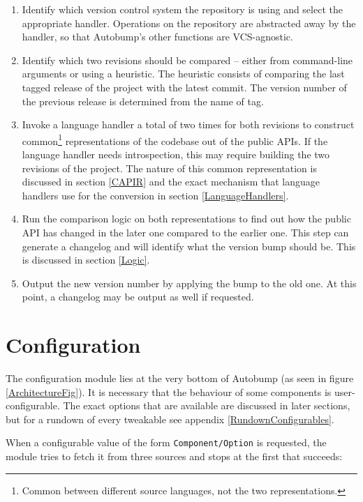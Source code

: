 \documentclass{l4proj}
\newcommand\genericstyle{\lstset{basicstyle=\ttm}}
\newcommand\codeinline[1]{{\genericstyle\lstinline!#1!}}
\begin{document}
\begin{enumerate}
\item Identify which version control system the repository is using
and select the appropriate handler. Operations on the repository are
abstracted away by the handler, so that Autobump's other functions are
VCS-agnostic.
\item Identify which two revisions should be compared -- either from
command-line arguments or using a heuristic. The heuristic
consists of comparing the last tagged release of the project with the
latest commit. The version number of the previous release is
determined from the name of tag.
\item Invoke a language handler a total of two times for both
revisions to construct common\footnote{Common between different
source languages, not the two representations.} representations of the
codebase out of the public APIs. If the language handler needs
introspection, this may require building the two revisions of the project.
The nature of this common representation is discussed in section \ref{CAPIR}
and the exact mechanism that language handlers use for the conversion
in section \ref{LanguageHandlers}.
\item Run the comparison logic on both representations to find
out how the public API has changed in the later one compared to the
earlier one. This step can generate a changelog and will identify what
the version bump should be. This is discussed in section \ref{Logic}.
\item Output the new version number by applying the bump to the old
one. At this point, a changelog may be output as well if requested.
\end{enumerate}

\section{Configuration}

The configuration module lies at the very bottom of Autobump (as seen
in figure \ref{ArchitectureFig}). It is necessary that the behaviour of
some components is user-configurable. The exact options that are
available are discussed in later sections, but for a rundown of every
tweakable see appendix \ref{RundownConfigurables}.

When a configurable value of the form \codeinline{Component/Option} is
requested, the module tries to fetch it from three sources and stops
at the first that succeeds:
\end{document}
